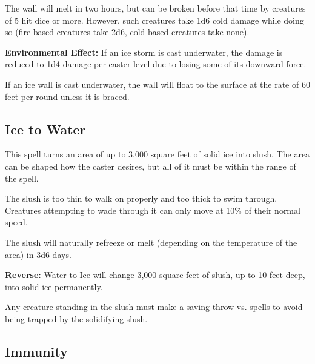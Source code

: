 \begin{multicols*}{2}
The wall will melt in two hours, but can be broken before that time by creatures of 5 hit dice or more. However, such creatures take 1d6 cold damage while doing so (fire based creatures take 2d6, cold based creatures take none).

\textbf{Environmental Effect:} If an ice storm is cast underwater, the damage is reduced to 1d4 damage per caster level due to losing some of its downward force.

If an ice wall is cast underwater, the wall will float to the surface at the rate of 60 feet per round unless it is braced.

\subsection{Ice to Water}\label{spell:Ice to Water}

This spell turns an area of up to 3,000 square feet of solid ice into slush. The area can be shaped how the caster desires, but all of it must be within the range of the spell.

The slush is too thin to walk on properly and too thick to swim through. Creatures attempting to wade through it can only move at 10\% of their normal speed.

The slush will naturally refreeze or melt (depending on the temperature of the area) in 3d6 days.

\textbf{Reverse:} \hypertarget{spell:Water to Ice}{Water to Ice} will change 3,000 square feet of slush, up to 10 feet deep, into solid ice permanently.

Any creature standing in the slush must make a saving throw vs. spells to avoid being trapped by the solidifying slush.

\subsection{Immunity}\label{spell:Immunity}


\end{multicols*}
